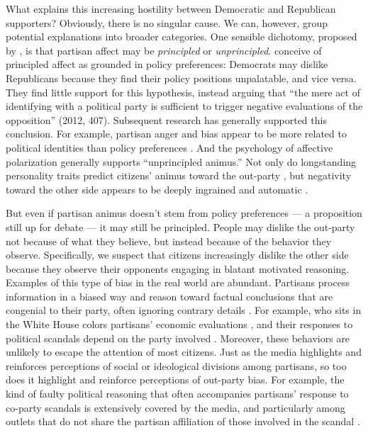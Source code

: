 \documentclass[12pt, letterpaper]{article}
\begin{document}
What explains this increasing hostility between Democratic and Republican supporters? Obviously, there is no singular cause. We can, however, group potential explanations into broader categories. One sensible dichotomy, proposed by \citet{IyengarSoodLelkes2012}, is that partisan affect may be \emph{principled} or \emph{unprincipled}. \citeauthor{IyengarSoodLelkes2012} conceive of principled affect as grounded in policy preferences: Democrats may dislike Republicans because they find their policy positions unpalatable, and vice versa. They find little support for this hypothesis, instead arguing that ``the mere act of identifying with a political party is sufficient to trigger negative evaluations of the opposition'' (2012, 407). Subsequent research has generally supported this conclusion. For example, partisan anger and bias appear to be more related to political identities than policy preferences \citep{mason_2015}. And the psychology of affective polarization generally supports ``unprincipled animus.'' Not only do longstanding personality traits predict citizens' animus toward the out-party \citep{webster2018personal}, but negativity toward the other side appears to be deeply ingrained and automatic \citep{IyengarWestwood2014}.

But even if partisan animus doesn't stem from policy preferences --- a proposition still up for debate \citep[e.g.,][]{rogowski2016how} --- it may still be principled. People may dislike the out-party not because of what they believe, but instead because of the behavior they observe. Specifically, we suspect that citizens increasingly dislike the other side because they observe their opponents engaging in blatant motivated reasoning. Examples of this type of bias in the real world are abundant. Partisans process information in a biased way and reason toward factual conclusions that are congenial to their party, often ignoring contrary details \citep{lodge2013}. For example, who sits in the White House colors partisans' economic evaluations \citep{bartels_2002,bisgaard2015bias}, and their responses to political scandals depend on the party involved \citep{ahlersood_2014}. Moreover, these behaviors are unlikely to escape the attention of most citizens. Just as the media highlights and reinforces perceptions of social or ideological divisions among partisans, so too does it highlight and reinforce perceptions of out-party bias. For example, the kind of faulty political reasoning that often accompanies partisans' response to co-party scandals is extensively covered by the media, and particularly among outlets that do not share the partisan affiliation of those involved in the scandal \citep{budaketal_2016,puglisisnyder_2011}. 
\end{document}
